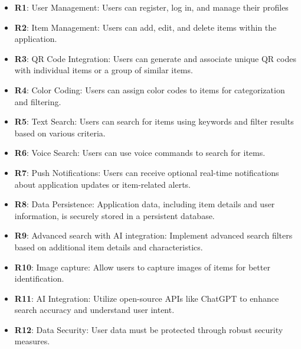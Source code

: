\documentclass[hidelinks, 12pt, a4paper]{article}
\begin{document}
\begin{itemize}
    \item \textbf {R1}: {User Management: Users can register, log in, and manage their profiles}

    \item \textbf{R2}: {Item Management: Users can add, edit, and delete items within the application.}

    \item \textbf{R3}: {QR Code Integration: Users can generate and associate unique QR codes with individual items or a group of similar items. }

    \item \textbf{R4}: {Color Coding: Users can assign color codes to items for categorization and filtering.}

    \item \textbf{R5}: {Text Search: Users can search for items using keywords and filter results based on various criteria.}

    \item \textbf{R6}: {Voice Search: Users can use voice commands to search for items.}

    \item \textbf{R7}: {Push Notifications: Users can receive optional real-time notifications about application updates or item-related alerts.}

    \item \textbf{R8}: {Data Persistence: Application data, including item details and user information, is securely stored in a persistent database.}

    \item \textbf{R9}: {Advanced search with AI integration: Implement advanced search filters based on additional item details and characteristics.}

    \item \textbf{R10}: {Image capture: Allow users to capture images of items for better identification.}

    \item \textbf{R11}: {AI Integration: Utilize open-source APIs like ChatGPT to enhance search accuracy and understand user intent.}

    \item \textbf{R12}: {Data Security: User data must be protected through robust security measures.}
\end{itemize}
\end{document}
